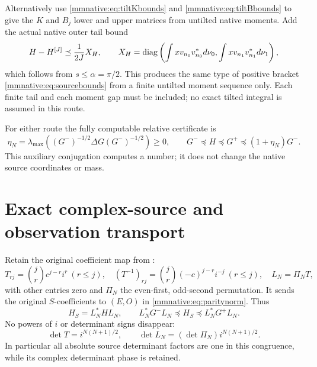Alternatively use \eqref{mmnative:eq:tiltKbounds} and
\eqref{mmnative:eq:tiltBbounds} to give the $K$ and $B_j$ lower and upper
matrices from untilted native moments.  Add the actual native outer
tail bound
\begin{equation}\label{mmnative:eq:untiltedouter}
 H-H^{[J]}\preceq\frac1{2J}X_H,\qquad
 X_H=\operatorname{diag}\left(\int xv_{n_0}v_{n_0}^*d\nu_0,
                    \int xv_{n_1}v_{n_1}^*d\nu_1\right),
\end{equation}
which follows from $s\le\alpha=\pi/2$.  This produces the same
type of positive bracket \eqref{mmnative:eq:sourcebounds} from a finite
untilted moment sequence only.  Each finite tail and each moment gap
must be included; no exact tilted integral is assumed in this route.

For either route the fully computable relative certificate is
\begin{equation}\label{mmnative:eq:eta}
 \eta_N=\lambda_{\max}((G^-)^{-1/2}\Delta G(G^-)^{-1/2})\ge0,
 \qquad G^-\preceq H\preceq G^+\preceq(1+\eta_N)G^-.
\end{equation}
This auxiliary conjugation computes a number; it does not change the
native source coordinates or mass.

\section{Exact complex-source and observation transport}

Retain the original coefficient map from \cite{mmnative:PP}:
\begin{equation}\label{mmnative:eq:transport}
 T_{rj}=\binom jr c^{j-r}i^r\ (r\le j),\quad
 (T^{-1})_{rj}=\binom jr(-c)^{j-r}i^{-j}\ (r\le j),\quad
 L_N=\Pi_NT,
\end{equation}
with other entries zero and $\Pi_N$ the even-first, odd-second
permutation.  It sends the original $S$-coefficients to $(E,O)$ in
\eqref{mmnative:eq:paritynorm}.  Thus
\begin{equation}\label{mmnative:eq:Sbounds}
 H_S=L_N^*HL_N,\qquad
 L_N^*G^-L_N\preceq H_S\preceq L_N^*G^+L_N.
\end{equation}
No powers of $i$ or determinant signs disappear:
\[
 \det T=i^{N(N+1)/2},\qquad
 \det L_N=(\det\Pi_N)i^{N(N+1)/2}.
\]
In particular all absolute source determinant factors are one in
this congruence, while its complex determinant phase is retained.

